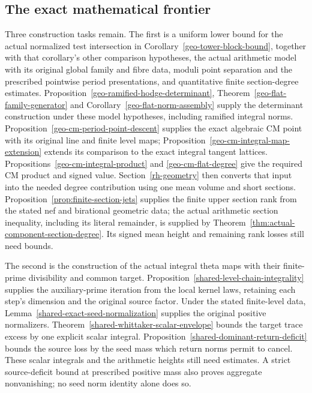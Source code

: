 \subsection{The exact mathematical frontier}

Three construction tasks remain. The first is a uniform lower bound
for the actual normalized test intersection in
Corollary~\ref{geo-tower-block-bound}, together with that corollary's
other comparison hypotheses, the actual arithmetic model with its original
global family and fibre data, moduli point separation and the prescribed
pointwise period presentations, and quantitative finite section-degree
estimates.
Proposition~\ref{geo-ramified-hodge-determinant},
Theorem~\ref{geo-flat-family-generator} and
Corollary~\ref{geo-flat-norm-assembly} supply the determinant construction
under these model hypotheses, including ramified integral norms.
Proposition~\ref{geo-cm-period-point-descent} supplies the exact algebraic
CM point with its original line and finite level maps;
Proposition~\ref{geo-cm-integral-map-extension} extends its comparison
to the exact integral tangent lattices.
Propositions~\ref{geo-cm-integral-product}
and \ref{geo-cm-flat-degree} give the required CM product and signed value.
Section~\ref{rh-geometry} then converts that input into the needed
degree contribution using one mean volume and short sections.
Proposition~\ref{prop:finite-section-jets} supplies the finite upper
section rank from the stated nef and birational geometric data; the
actual arithmetic section inequality, including its literal remainder,
is supplied by Theorem~\ref{thm:actual-component-section-degree}.
Its signed mean height and remaining rank losses still need bounds.

The second is the construction of the actual integral theta maps with
their finite-prime divisibility and common target.
Proposition~\ref{shared-level-chain-integrality} supplies the
auxiliary-prime iteration from the local kernel laws, retaining each
step's dimension and the original source factor. Under the stated
finite-level data, Lemma~\ref{shared-exact-seed-normalization} supplies
the original positive normalizers. Theorem~\ref{shared-whittaker-scalar-envelope}
bounds the target trace excess by one explicit scalar integral.
Proposition~\ref{shared-dominant-return-deficit} bounds the source
loss by the seed mass which return norms permit to cancel.
These scalar integrals and the arithmetic heights still need estimates.
A strict source-deficit bound at prescribed positive mass
also proves aggregate nonvanishing; no seed norm identity alone does so.

